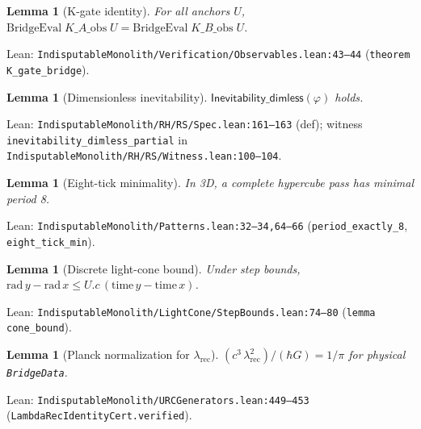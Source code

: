 \documentclass[11pt,a4paper,twoside]{article}
\numberwithin{equation}{section}
\theoremstyle{customthm}
\newtheorem{lemma}[theorem]{Lemma}
\theoremstyle{customdef}
\theoremstyle{customrem}
\begin{document}
\begin{lemma}[K-gate identity]\label{lem:kgate}
For all anchors $U$, \(\mathrm{BridgeEval}\;K\_A\_\mathrm{obs}\;U = \mathrm{BridgeEval}\;K\_B\_\mathrm{obs}\;U\).
\end{lemma}
\noindent Lean: \texttt{IndisputableMonolith/Verification/Observables.lean:43--44} (\texttt{theorem K\_gate\_bridge}).

\begin{lemma}[Dimensionless inevitability]\label{lem:inevitability}
\(\mathsf{Inevitability\_dimless}(\varphi)\) holds.
\end{lemma}
\noindent Lean: \texttt{IndisputableMonolith/RH/RS/Spec.lean:161--163} (def); witness \texttt{inevitability\_dimless\_partial} in \texttt{IndisputableMonolith/RH/RS/Witness.lean:100--104}.

\begin{lemma}[Eight-tick minimality]\label{lem:eight}
In 3D, a complete hypercube pass has minimal period 8.
\end{lemma}
\noindent Lean: \texttt{IndisputableMonolith/Patterns.lean:32--34,64--66} (\texttt{period\_exactly\_8}, \texttt{eight\_tick\_min}).

\begin{lemma}[Discrete light-cone bound]\label{lem:cone}
Under step bounds, \(\mathrm{rad}\,y - \mathrm{rad}\,x \le U.c\, (\mathrm{time}\,y - \mathrm{time}\,x)\).
\end{lemma}
\noindent Lean: \texttt{IndisputableMonolith/LightCone/StepBounds.lean:74--80} (\texttt{lemma cone\_bound}).

\begin{lemma}[Planck normalization for $\lambda_{\mathrm{rec}}$]\label{lem:planck}
\( (c^3\,\lambda_{\mathrm{rec}}^2)/(\hbar G) = 1/\pi \) for physical \texttt{BridgeData}.
\end{lemma}
\noindent Lean: \texttt{IndisputableMonolith/URCGenerators.lean:449--453} (\texttt{LambdaRecIdentityCert.verified}).
\end{document}
